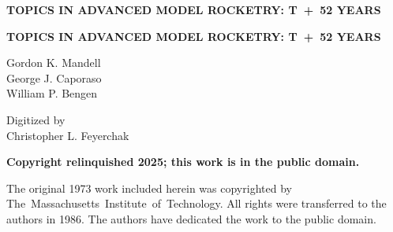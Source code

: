 \thispagestyle{empty}
\label{front:halftitle2025}
\vspace*{0.442\textheight}
{\centering\large\bfseries
TOPICS IN ADVANCED MODEL ROCKETRY: T~+~52 YEARS\par}
\clearpage
\thispagestyle{empty}
\label{front:title2025}
\vspace*{0.442\textheight}
{\centering\large\bfseries
TOPICS IN ADVANCED MODEL ROCKETRY: T~+~52 YEARS\par
\vspace{\baselineskip}
Gordon K. Mandell\\
George J. Caporaso\\
William P. Bengen\par
\vspace{\baselineskip}
Digitized by\\
Christopher L. Feyerchak\par}
\clearpage
\thispagestyle{empty}
\label{front:notice2025}
\vspace*{0.442\textheight}
{\raggedright\large\bfseries
\noindent Copyright relinquished 2025; this work is in the public domain.\par
\vspace{\baselineskip}
\noindent The original 1973 work included herein was copyrighted by
The~Massachusetts~Institute~of~Technology. All rights were transferred to the authors in 1986. The
authors have dedicated the work to the public domain.\par}
\clearpage
